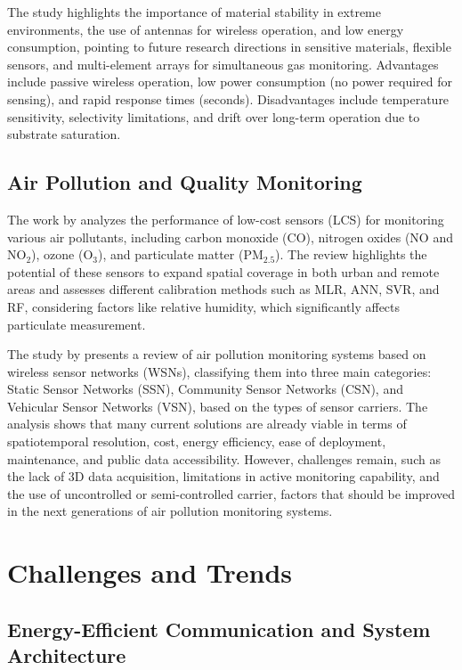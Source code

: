 \documentclass[conference]{IEEEtran}
\begin{document}
The study highlights the importance of material stability in extreme environments, the use of antennas for wireless operation, and low energy consumption, pointing to future research directions in sensitive materials, flexible sensors, and multi-element arrays for simultaneous gas monitoring. Advantages include passive wireless operation, low power consumption (no power required for sensing), and rapid response times (seconds). Disadvantages include temperature sensitivity, selectivity limitations, and drift over long-term operation due to substrate saturation.

\subsection{Air Pollution and Quality Monitoring}

The work by \cite{karagulian_2019_review} analyzes the performance of low-cost sensors (LCS) for monitoring various air pollutants, including carbon monoxide (CO), nitrogen oxides (NO and NO$_2$), ozone (O$_3$), and particulate matter (PM$_{2.5}$). The review highlights the potential of these sensors to expand spatial coverage in both urban and remote areas and assesses different calibration methods such as MLR, ANN, SVR, and RF, considering factors like relative humidity, which significantly affects particulate measurement.

The study by \cite{yi_2015_a} presents a review of air pollution monitoring systems based on wireless sensor networks (WSNs), classifying them into three main categories: Static Sensor Networks (SSN), Community Sensor Networks (CSN), and Vehicular Sensor Networks (VSN), based on the types of sensor carriers. The analysis shows that many current solutions are already viable in terms of spatiotemporal resolution, cost, energy efficiency, ease of deployment, maintenance, and public data accessibility. However, challenges remain, such as the lack of 3D data acquisition, limitations in active monitoring capability, and the use of uncontrolled or semi-controlled carrier, factors that should be improved in the next generations of air pollution monitoring systems.

\section{Challenges and Trends} \label{cap:challenges}

\subsection{Energy-Efficient Communication and System Architecture}
\end{document}
